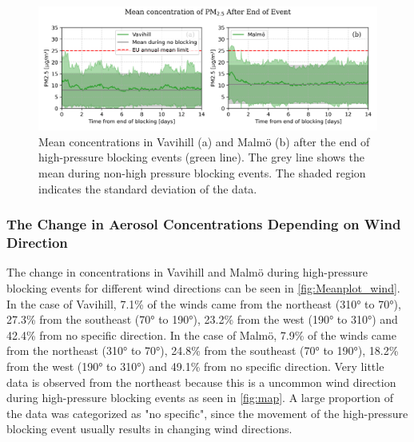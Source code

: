 \begin{figure}[H]
    \centering
    \includegraphics[width=\textwidth]{Figures/Meanplot_after.png}
    \caption{Mean \PM concentrations in Vavihill (a) and Malmö (b) after the end of high-pressure blocking events (green line). The grey line shows the mean \PM during non-high pressure blocking events. The shaded region indicates the standard deviation of the data.  }
    \label{fig:Meanplot_after}
\end{figure}


\subsubsection{The Change in Aerosol Concentrations Depending on Wind Direction}

The change in \PM concentrations in Vavihill and Malmö during high-pressure blocking events for different wind directions can be seen in \autoref{fig:Meanplot_wind}. In the case of Vavihill, 7.1\% of the winds came from the northeast (310° to 70°), 27.3\% from the southeast (70° to 190°), 23.2\% from the west (190° to 310°) and 42.4\% from no specific direction. In the case of Malmö, 7.9\% of the winds came from the northeast (310° to 70°), 24.8\% from the southeast (70° to 190°), 18.2\% from the west (190° to 310°) and 49.1\% from no specific direction. Very little data is observed from the northeast because this is a uncommon wind direction during high-pressure blocking events as seen in \autoref{fig:map}. A large proportion of the data was categorized as "no specific", since the movement of the high-pressure blocking event usually results in changing wind directions. 


